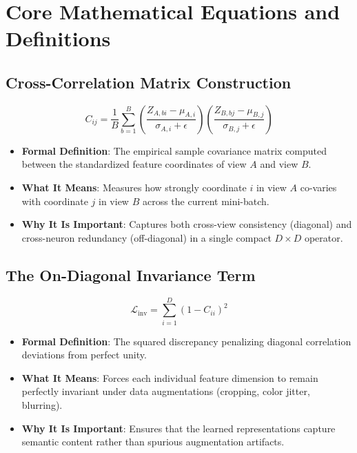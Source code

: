 \documentclass[11pt,a4paper]{article}
\theoremstyle{definition}
\begin{document}
\section{Core Mathematical Equations and Definitions}

\subsection{Cross-Correlation Matrix Construction}
{\boldmath
\begin{equation}
C_{ij} = \frac{1}{B} \sum_{b=1}^B \left( \frac{Z_{A, bi} - \mu_{A, i}}{\sigma_{A, i} + \epsilon} \right) \left( \frac{Z_{B, bj} - \mu_{B, j}}{\sigma_{B, j} + \epsilon} \right)
\end{equation}
}
\begin{itemize}
    \item \textbf{Formal Definition}: The empirical sample covariance matrix computed between the standardized feature coordinates of view $A$ and view $B$.
    \item \textbf{What It Means}: Measures how strongly coordinate $i$ in view $A$ co-varies with coordinate $j$ in view $B$ across the current mini-batch.
    \item \textbf{Why It Is Important}: Captures both cross-view consistency (diagonal) and cross-neuron redundancy (off-diagonal) in a single compact $D \times D$ operator.
\end{itemize}

\subsection{The On-Diagonal Invariance Term}
{\boldmath
\begin{equation}
\mathcal{L}_{\text{inv}} = \sum_{i=1}^D (1 - C_{ii})^2
\end{equation}
}
\begin{itemize}
    \item \textbf{Formal Definition}: The squared discrepancy penalizing diagonal correlation deviations from perfect unity.
    \item \textbf{What It Means}: Forces each individual feature dimension to remain perfectly invariant under data augmentations (cropping, color jitter, blurring).
    \item \textbf{Why It Is Important}: Ensures that the learned representations capture semantic content rather than spurious augmentation artifacts.
\end{itemize}
\end{document}
